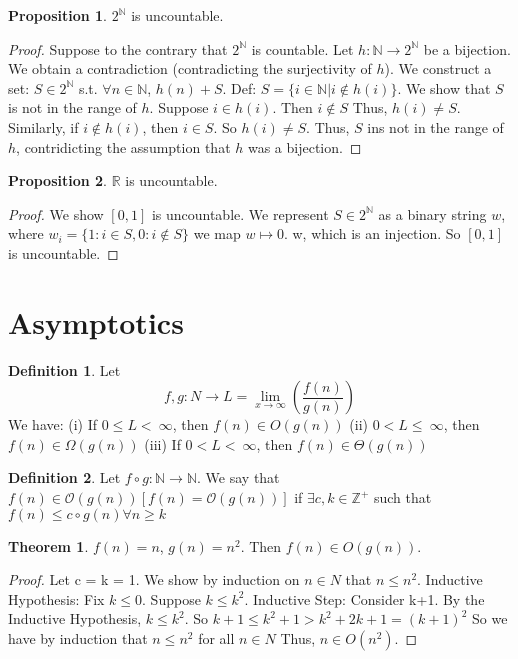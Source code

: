 \documentclass{article}
\theoremstyle{definition}
\newtheorem{define}{Definition}[section]
\newtheorem{prop}{Proposition}[section]
\newtheorem{thm}{Theorem}[section]
\begin{document}
\begin{prop}
 $2^\mathbb{N}$ is uncountable.
\end{prop}
\begin{proof}
Suppose to the contrary that $2^\mathbb{N}$ is countable. Let $h: \mathbb{N} \rightarrow 2^\mathbb{N}$ be a bijection. We obtain a contradiction (contradicting the surjectivity of $h$). We construct a set: $S \in 2^\mathbb{N}$ s.t. $\forall n\in \mathbb{N}$, $h(n)+S$. Def: $S=\{i \in \mathbb{N} | i \notin h(i)\}$. We show that $S$ is not in the range of $h$. Suppose $i \in h(i)$. Then $i\notin S$ Thus, $h(i)\neq S$. Similarly, if $i \notin h(i)$, then $i\in S$. So $h(i)\neq S$. Thus, $S$ ins not in the range of $h$, contridicting the assumption that $h$ was a bijection.
\end{proof}

\begin{prop}
$\mathbb{R}$ is uncountable.
\end{prop}
\begin{proof}
We show $[0,1]$ is uncountable. We represent $S\in 2^\mathbb{N}$ as a binary string $w$, where $w_i = \{1: i\in S, 0: i \notin S\}$ we map $w\mapsto 0$. w, which is an injection. So $[0,1]$ is uncountable.
\end{proof}

\section{Asymptotics}

\begin{define}
Let $$f,g: N \rightarrow L=\lim _{x\to \infty }\left(\frac{f\left(n\right)}{g\left(n\right)}\right)$$
We have: (i) If $0 \leq L< \:\infty$, then $f(n)\in O(g(n))$ (ii) $0 < L \leq \:\infty$, then $f(n)\in\Omega(g(n))$ (iii) If $0<L< \:\infty$, then $f(n)\in\Theta(g(n))$
\end{define}

\begin{define}
Let $f \circ g: \mathbb{N} \rightarrow \mathbb{N}$. We say that $ f(n) \in \mathcal{O}(g(n)) [f(n) = \mathcal{O}(g(n))]$ if $\exists c,k\in \mathbb{Z}^{+}$ such that $f(n) \leq c\circ g(n) \forall n \geq k$
\end{define}

\begin{thm}
$f(n)=n$, $g(n) =n^2$. Then $f(n)\in O(g(n))$.
\end{thm}
\begin{proof}
Let c = k = 1. We show by induction on $n \in N$ that $n \leq n^2$. Inductive Hypothesis: Fix $k \leq 0$. Suppose $k \leq k^2$.
Inductive Step: Consider k+1. By the Inductive Hypothesis, $k \leq k^2$. So $k+1 \leq k^2+1 > k^2 +2k+1 = (k+1)^2$ So we have by induction that $n \leq n^2$ for all $n \in N$ Thus, $n \in O(n^2)$.
\end{proof}
\end{document}
